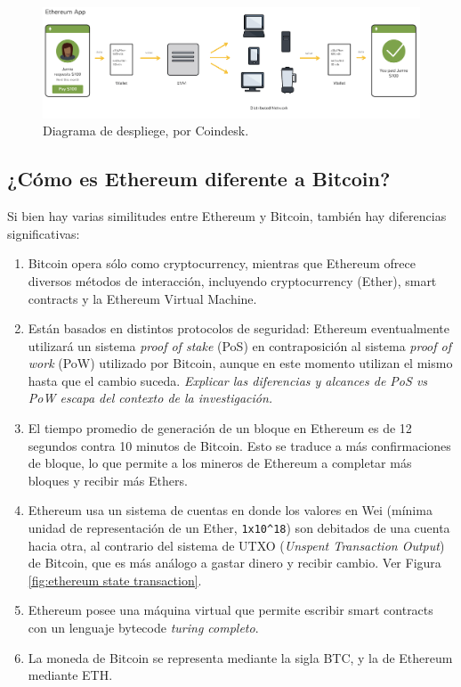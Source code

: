 \begin{figure}[h]
    \centering
    \includegraphics[scale=0.5]{images/ethflowapp.png}
    \caption{Diagrama de despliege, por Coindesk.}
    \label{fig:ethereum app}
\end{figure}

\subsection{¿Cómo es Ethereum diferente a Bitcoin?}
Si bien hay varias similitudes entre Ethereum y Bitcoin, también hay diferencias significativas:
\begin{enumerate}
    \item Bitcoin opera sólo como cryptocurrency, mientras que Ethereum ofrece diversos métodos de interacción, incluyendo cryptocurrency (Ether), smart contracts y la Ethereum Virtual Machine.
    \item Están basados en distintos protocolos de seguridad: Ethereum eventualmente utilizará un sistema \textit{proof of stake} (PoS) en contraposición al sistema \textit{proof of work} (PoW) utilizado por Bitcoin, aunque en este momento utilizan el mismo hasta que el cambio suceda. \textit{Explicar las diferencias y alcances de PoS vs PoW escapa del contexto de la investigación.}
    \item El tiempo promedio de generación de un bloque en Ethereum es de 12 segundos contra 10 minutos de Bitcoin. Esto se traduce a más confirmaciones de bloque, lo que permite a los mineros de Ethereum a completar más bloques y recibir más Ethers.
    \item Ethereum usa un sistema de cuentas en donde los valores en Wei (mínima unidad de representación de un Ether, \verb|1x10^18|) son debitados de una cuenta hacia otra, al contrario del sistema de UTXO (\textit{Unspent Transaction Output}) de Bitcoin, que es más análogo a gastar dinero y recibir cambio. Ver Figura \ref{fig:ethereum state transaction}.
    \item Ethereum posee una máquina virtual que permite escribir smart contracts con un lenguaje bytecode \textit{turing completo}.
    \item La moneda de Bitcoin se representa mediante la sigla BTC, y la de Ethereum mediante ETH.
\end{enumerate}

